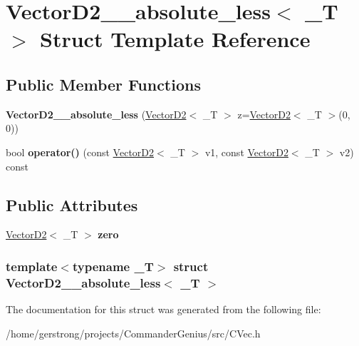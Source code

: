 \hypertarget{struct_vector_d2____absolute__less}{
\section{VectorD2\_\-\_\-absolute\_\-less$<$ \_\-T $>$ Struct Template Reference}
\label{struct_vector_d2____absolute__less}
}
\subsection*{Public Member Functions}
\begin{DoxyCompactItemize}
\item 
\hypertarget{struct_vector_d2____absolute__less_aacad781955b71e4a07eb4e9ebb42876a}{
{\bfseries VectorD2\_\-\_\-absolute\_\-less} (\hyperlink{struct_vector_d2}{VectorD2}$<$ \_\-T $>$ z=\hyperlink{struct_vector_d2}{VectorD2}$<$ \_\-T $>$(0, 0))}
\label{struct_vector_d2____absolute__less_aacad781955b71e4a07eb4e9ebb42876a}

\item 
\hypertarget{struct_vector_d2____absolute__less_aed56086b6dab2da56ee9ecb6dcd910b1}{
bool {\bfseries operator()} (const \hyperlink{struct_vector_d2}{VectorD2}$<$ \_\-T $>$ v1, const \hyperlink{struct_vector_d2}{VectorD2}$<$ \_\-T $>$ v2) const }
\label{struct_vector_d2____absolute__less_aed56086b6dab2da56ee9ecb6dcd910b1}

\end{DoxyCompactItemize}
\subsection*{Public Attributes}
\begin{DoxyCompactItemize}
\item 
\hypertarget{struct_vector_d2____absolute__less_a7dbf1bddd0efc436e830ffc5961377d6}{
\hyperlink{struct_vector_d2}{VectorD2}$<$ \_\-T $>$ {\bfseries zero}}
\label{struct_vector_d2____absolute__less_a7dbf1bddd0efc436e830ffc5961377d6}

\end{DoxyCompactItemize}
\subsubsection*{template$<$typename \_\-T$>$ struct VectorD2\_\-\_\-absolute\_\-less$<$ \_\-T $>$}



The documentation for this struct was generated from the following file:\begin{DoxyCompactItemize}
\item 
/home/gerstrong/projects/CommanderGenius/src/CVec.h\end{DoxyCompactItemize}
